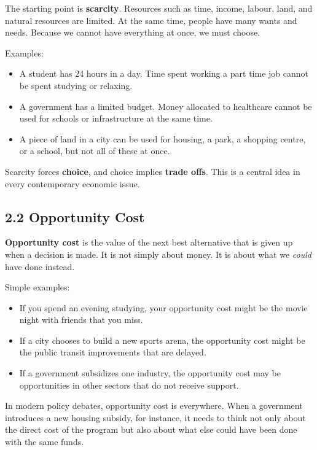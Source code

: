 \documentclass[12pt]{article}
\begin{document}
The starting point is \textbf{scarcity}. Resources such as time, income, labour, land, and natural resources are limited. At the same time, people have many wants and needs. Because we cannot have everything at once, we must choose.

Examples:

\begin{itemize}[noitemsep]
    \item A student has 24 hours in a day. Time spent working a part time job cannot be spent studying or relaxing.
    \item A government has a limited budget. Money allocated to healthcare cannot be used for schools or infrastructure at the same time.
    \item A piece of land in a city can be used for housing, a park, a shopping centre, or a school, but not all of these at once.
\end{itemize}

Scarcity forces \textbf{choice}, and choice implies \textbf{trade offs}. This is a central idea in every contemporary economic issue.

\subsection*{2.2 Opportunity Cost}

\textbf{Opportunity cost} is the value of the next best alternative that is given up when a decision is made. It is not simply about money. It is about what we \emph{could} have done instead.

Simple examples:

\begin{itemize}[noitemsep]
    \item If you spend an evening studying, your opportunity cost might be the movie night with friends that you miss.
    \item If a city chooses to build a new sports arena, the opportunity cost might be the public transit improvements that are delayed.
    \item If a government subsidizes one industry, the opportunity cost may be opportunities in other sectors that do not receive support.
\end{itemize}

In modern policy debates, opportunity cost is everywhere. When a government introduces a new housing subsidy, for instance, it needs to think not only about the direct cost of the program but also about what else could have been done with the same funds.
\end{document}

